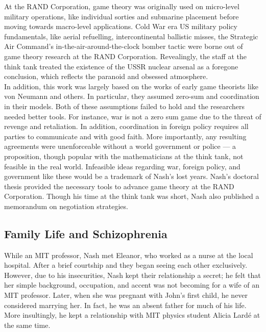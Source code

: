 \documentclass[12pt]{article}
\begin{document}
At the RAND Corporation, game theory was originally used on micro-level military operations, like individual sorties and submarine placement before moving towards macro-level applications. Cold War era US military policy fundamentals, like aerial refuelling, intercontinental ballistic misses, the Strategic Air Command's in-the-air-around-the-clock bomber tactic were borne out of game theory research at the RAND Corporation. Revealingly, the staff at the think tank treated the existence of the USSR nuclear arsenal as a foregone conclusion, which reflects the paranoid and obsessed atmosphere.\\

In addition, this work was largely based on the works of early game theorists like von Neumann and others. In particular, they assumed zero-sum and coordination in their models. Both of these assumptions failed to hold and the researchers needed better tools. For instance, war is not a zero sum game due to the threat of revenge and retaliation. In addition, coordination in foreign policy requires all parties to communicate and with good faith. More importantly, any resulting agreements were unenforceable without a world government or police --- a proposition, though popular with the mathematicians at the think tank, not feasible in the real world. Infeasible ideas regarding war, foreign policy, and government like these would be a trademark of Nash's lost years. Nash's doctoral thesis provided the necessary tools to advance game theory at the RAND Corporation. Though his time at the think tank was short, Nash also published a memorandum on negotiation strategies.

\subsection{Family Life and Schizophrenia}

While an MIT professor, Nash met Eleanor, who worked as a nurse at the local hospital. After a brief courtship and they began seeing each other exclusively. However, due to his insecurities,  Nash kept their relationship a secret; he felt that her simple background, occupation, and accent was not becoming for a wife of an MIT professor. Later, when she was pregnant with John's first child, he never considered marrying her. In fact, he was an absent father for much of his life. More insultingly, he kept a relationship with MIT physics student Alicia Lard\'e at the same time.\\
\end{document}
